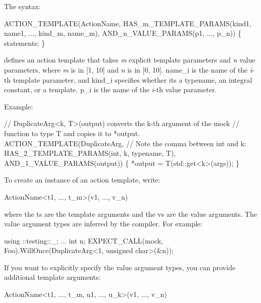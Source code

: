 The syntax\+:


\begin{DoxyCode}
ACTION\_TEMPLATE(ActionName,
                HAS\_m\_TEMPLATE\_PARAMS(kind1, name1, ..., kind\_m, name\_m),
                AND\_n\_VALUE\_PARAMS(p1, ..., p\_n)) \{ statements; \}
\end{DoxyCode}


defines an action template that takes {\itshape m} explicit template parameters and {\itshape n} value parameters, where {\itshape m} is in \mbox{[}1, 10\mbox{]} and {\itshape n} is in \mbox{[}0, 10\mbox{]}. {\ttfamily name\+\_\+i} is the name of the {\itshape i}-\/th template parameter, and {\ttfamily kind\+\_\+i} specifies whether it\textquotesingle{}s a {\ttfamily typename}, an integral constant, or a template. {\ttfamily p\+\_\+i} is the name of the {\itshape i}-\/th value parameter.

Example\+:


\begin{DoxyCode}
\textcolor{comment}{// DuplicateArg<k, T>(output) converts the k-th argument of the mock}
\textcolor{comment}{// function to type T and copies it to *output.}
ACTION\_TEMPLATE(DuplicateArg,
                \textcolor{comment}{// Note the comma between int and k:}
                HAS\_2\_TEMPLATE\_PARAMS(\textcolor{keywordtype}{int}, k, \textcolor{keyword}{typename}, T),
                AND\_1\_VALUE\_PARAMS(output)) \{
  *output = T(std::get<k>(args));
\}
\end{DoxyCode}


To create an instance of an action template, write\+:


\begin{DoxyCode}
ActionName<t1, ..., t\_m>(v1, ..., v\_n)
\end{DoxyCode}


where the {\ttfamily t}s are the template arguments and the {\ttfamily v}s are the value arguments. The value argument types are inferred by the compiler. For example\+:


\begin{DoxyCode}
using ::testing::\_;
...
  \textcolor{keywordtype}{int} n;
  EXPECT\_CALL(mock, Foo).WillOnce(DuplicateArg<1, unsigned char>(&n));
\end{DoxyCode}


If you want to explicitly specify the value argument types, you can provide additional template arguments\+:


\begin{DoxyCode}
ActionName<t1, ..., t\_m, u1, ..., u\_k>(v1, ..., v\_n)
\end{DoxyCode}


